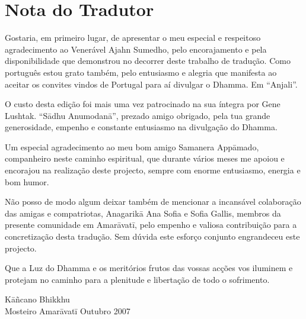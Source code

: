 \chapter{Nota do Tradutor}

Gostaria, em primeiro lugar, de apresentar o meu especial e respeitoso
agradecimento ao Venerável Ajahn Sumedho, pelo encorajamento e pela
disponibilidade que demonstrou no decorrer deste trabalho de tradução. Como
português estou grato também, pelo entusiasmo e alegria que manifesta ao aceitar
os convites vindos de Portugal para aí divulgar o Dhamma. Em “Anjali”.

O custo desta edição foi mais uma vez patrocinado na sua íntegra por Gene
Lushtak. “Sādhu Anumodanā”, prezado amigo obrigado, pela tua grande
generosidade, empenho e constante entusiasmo na divulgação do Dhamma.


Um especial agradecimento ao meu bom amigo Samanera Appāmado, companheiro neste
caminho espiritual, que durante vários meses me apoiou e encorajou na realização
deste projecto, sempre com enorme entusiasmo, energia e bom humor.

Não posso de modo algum deixar também de mencionar a incansável colaboração das
amigas e compatriotas, Anagarikā Ana Sofia e Sofia Gallis, membros da presente
comunidade em Amarāvatī, pelo empenho e valiosa contribuição para a
concretização desta tradução. Sem dúvida este esforço conjunto engrandeceu este
projecto.

Que a Luz do Dhamma e os meritórios frutos das vossas acções vos iluminem e
protejam no caminho para a plenitude e libertação de todo o sofrimento.

\bigskip

{\raggedleft
  Kāñcano Bhikkhu\\
  Mosteiro Amarāvatī
  Outubro 2007
\par}

